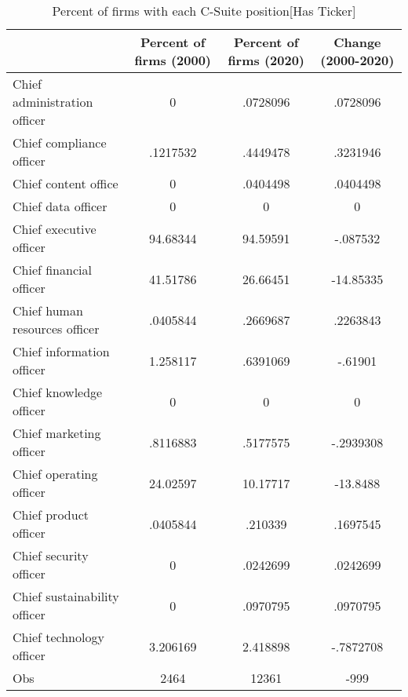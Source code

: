 \begin{table}[htbp]\centering
\caption{Percent of firms with each C-Suite position[Has Ticker]\label{tab98}}
\begin{tabular}{l*{3}{c}}
\toprule
                    &Percent of firms (2000)&Percent of firms (2020)&Change (2000-2020)\\
\midrule
Chief administration officer&           0&    .0728096&    .0728096\\
Chief compliance officer&    .1217532&    .4449478&    .3231946\\
Chief content office&           0&    .0404498&    .0404498\\
Chief data officer  &           0&           0&           0\\
Chief executive officer&    94.68344&    94.59591&    -.087532\\
Chief financial officer&    41.51786&    26.66451&   -14.85335\\
Chief human resources officer&    .0405844&    .2669687&    .2263843\\
Chief information officer&    1.258117&    .6391069&     -.61901\\
Chief knowledge officer&           0&           0&           0\\
Chief marketing officer&    .8116883&    .5177575&   -.2939308\\
Chief operating officer&    24.02597&    10.17717&    -13.8488\\
Chief product officer&    .0405844&     .210339&    .1697545\\
Chief security officer&           0&    .0242699&    .0242699\\
Chief sustainability officer&           0&    .0970795&    .0970795\\
Chief technology officer&    3.206169&    2.418898&   -.7872708\\
Obs                 &        2464&       12361&        -999\\
\bottomrule
\end{tabular}
\end{table}

